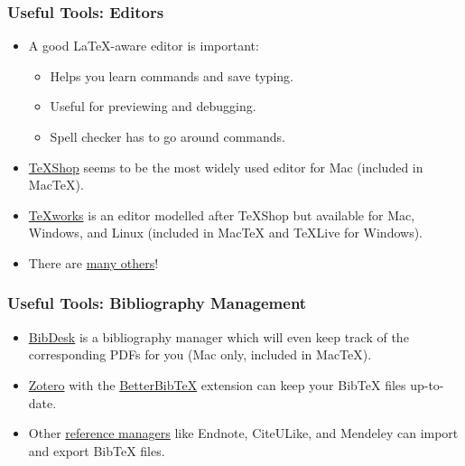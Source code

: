 \begin{frame}
\frametitle{Useful Tools: Editors}

\begin{itemize}
\item A good \LaTeX-aware editor is important:
\begin{itemize}
\item Helps you learn commands and save typing.
\item Useful for previewing and debugging.
\item Spell checker has to go around commands.
\end{itemize}
\item \href{http://pages.uoregon.edu/koch/texshop/texshop.html}{TeXShop}
 seems to be the most widely used editor for Mac (included in MacTeX).
\item \href{http://www.tug.org/texworks/}{TeXworks} is an editor 
modelled after TeXShop but available for Mac, Windows, and Linux 
(included in MacTeX and TeXLive for Windows).
\item There are
  \href{http://en.wikipedia.org/wiki/Comparison_of_TeX_editors}{many
    others}!
\end{itemize}

\end{frame}

\begin{frame}
\frametitle{Useful Tools: Bibliography Management}

\begin{itemize}
\item \href{http://bibdesk.sourceforge.net/}{BibDesk} is a
  bibliography manager which will even keep track of the corresponding
  PDFs for you (Mac only, included in MacTeX).
\item \href{http://www.zotero.org/}{Zotero} with the \href{https://retorque.re/zotero-better-bibtex/}{BetterBib\TeX{}}
extension can keep your Bib\TeX{} files up-to-date. 
\item Other
  \href{http://en.wikipedia.org/wiki/Comparison_of_reference_management_software}{reference
    managers} like Endnote, CiteULike, and Mendeley can import and export
  Bib\TeX{} files.
\end{itemize}

\end{frame}

